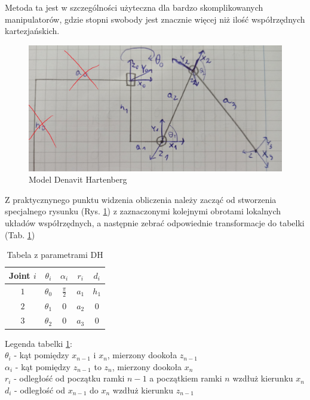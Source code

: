 Metoda ta jest w szczególności użyteczna dla bardzo skomplikowanych manipulatorów, gdzie stopni swobody jest znacznie więcej niż ilość współrzędnych kartezjańskich.\\

\begin{figure}[h!]
\includegraphics[width=\textwidth]{img/DH_model.jpg}
\caption{Model Denavit Hartenberg}
\label{math_model_DH}
\end{figure}

Z praktycznynego punktu widzenia obliczenia należy zacząć od stworzenia specjalnego rysunku (Rys. \ref{math_model_DH}) z zaznaczonymi kolejnymi obrotami lokalnych układów współrzędnych, a następnie zebrać odpowiednie transformacje do tabelki (Tab. \ref{table:DH_table})\\

\begin{table}[h!]
\centering
\begin{tabular}{c | c c c c }
 Joint $i$ & $\theta_i$ & $\alpha_i$ & $r_i$ & $d_i$ \\
 \hline
 $1$  & $\theta_0$ & $\frac{\pi}{2}$ & $a_1$ & $h_1$ \\
 $2$  & $\theta_1$ & $0$ & $a_2$ & $0$ \\
 $3$  & $\theta_2$ & $0$ & $a_3$ & $0$ \\
\end{tabular}
\caption{Tabela z parametrami DH}
\label{table:DH_table}
\end{table}

Legenda tabelki \ref{table:DH_table}: \\
$\theta_i$ - kąt pomiędzy $x_{n-1}$ i $x_n$, mierzony dookoła $z_{n-1}$\\
$\alpha_i$ - kąt pomiędzy $z_{n-1}$ to $z_n$, mierzony dookoła $x_n$\\
$r_i$ - odległość od początku ramki $n-1$ a początkiem ramki $n$ wzdłuż kierunku $x_n$\\ 
$d_i$ - odległość od $x_{n-1}$ do $x_n$ wzdłuż kierunku $z_{n-1}$\\

